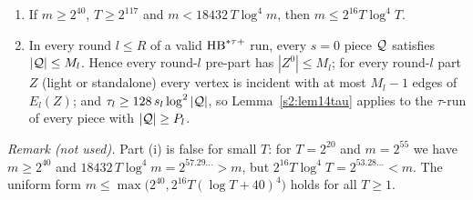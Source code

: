 \begin{lemma}\label{s2:lemCap}
\begin{enumerate}
\item[(i)] If $m\ge2^{40}$, $T\ge2^{117}$ and $m<18432\,T\log^4m$, then
$m\le2^{16}T\log^4T$.
\item[(ii)] In every round $l\le R$ of a valid $\mathrm{HB}^{*\tau{+}}$ run, every $s=0$ piece
$\mathcal{Q}$ satisfies $|\mathcal{Q}|\le M_l$. Hence every round-$l$ pre-part has
$|Z^0|\le M_l$; for every round-$l$ part $Z$ (light or standalone) every vertex
is incident with at most $M_l-1$ edges of $E_l(Z)$; and
$\tau_l\ge128\,s_l\log^2|\mathcal{Q}|$, so Lemma~\ref{s2:lem14tau} applies to the
$\tau$-run of every piece with $|\mathcal{Q}|\ge P_l$.
\end{enumerate}
\emph{Remark (not used).} Part (i) is false for small $T$: for $T=2^{20}$ and
$m=2^{55}$ we have $m\ge2^{40}$ and $18432\,T\log^4m=2^{57.29\ldots}>m$, but
$2^{16}T\log^4T=2^{53.28\ldots}<m$. The uniform form $m\le\max\bigl(2^{40},
2^{16}T(\log T+40)^4\bigr)$ holds for all $T\ge1$.
\deps{\ref{s1:citLem25}, \ref{s1:condG2}, \ref{s2:defHBtp}, \ref{s2:lem14tau}}
\end{lemma}

